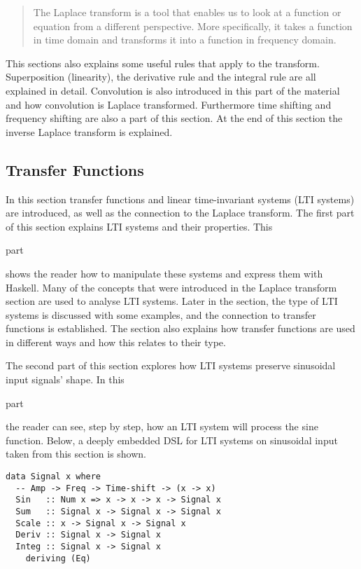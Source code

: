 \blockquote{The Laplace transform is a tool that enables us to look at a function or equation from a different perspective. 
More specifically, it takes a function in time domain  and transforms it into a function in frequency domain.
}

This sections also explains some useful rules that apply to the transform. Superposition (linearity), the derivative rule and the integral rule are all explained in detail. Convolution is also introduced in this part of the material and how convolution is Laplace transformed. Furthermore time shifting and frequency shifting are also a part of this section. At the end of this section the inverse Laplace transform is explained.

\subsection{Transfer Functions}
In this section transfer functions and linear time-invariant systems (\gls{LTI} systems) are introduced, as well as the connection to the Laplace transform. The first part of this section explains \gls{LTI} systems and their properties. This 
\begin{modtext}
part %
\end{modtext}
shows the reader how to manipulate these systems and express them with \gls{Haskell}. Many of the concepts that were introduced in the Laplace transform section are used to analyse \gls{LTI} systems. Later in the section, the type of \gls{LTI} systems is discussed with some examples, and the connection to transfer functions is established. The section also explains how transfer functions are used in different ways and how this relates to their type.

The second part of this section explores how \gls{LTI} systems preserve sinusoidal input signals' shape. In this 
\begin{modtext}
part %
\end{modtext}
the reader can see, step by step, how an \gls{LTI} system will process the sine function. Below, a deeply embedded \gls{DSL} for \gls{LTI} systems on sinusoidal input taken from this section is shown.

\begin{verbatim}
data Signal x where
  -- Amp -> Freq -> Time-shift -> (x -> x)
  Sin   :: Num x => x -> x -> x -> Signal x
  Sum   :: Signal x -> Signal x -> Signal x
  Scale :: x -> Signal x -> Signal x
  Deriv :: Signal x -> Signal x
  Integ :: Signal x -> Signal x
    deriving (Eq)
\end{verbatim}

